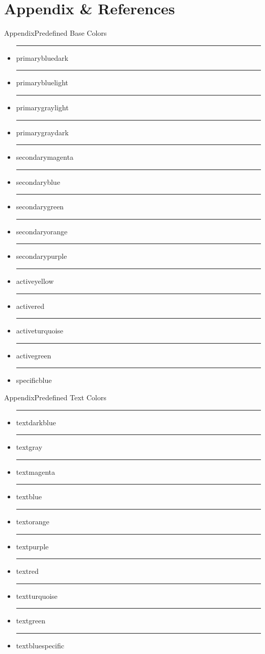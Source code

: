 \documentclass{beamer}
\begin{document}
\section{Appendix \& References}
\appendix 

\begin{frame}{Appendix}{Predefined Base Colors}
	\begin{itemize}
		\item {\color{primarybluedark}\rule{.7cm}{.4cm} primarybluedark}
		\item {\color{primarybluelight}\rule{.7cm}{.4cm} primarybluelight}
		\item {\color{primarygraylight}\rule{.7cm}{.4cm} primarygraylight}
		\item {\color{primarygraydark}\rule{.7cm}{.4cm} primarygraydark}
		\item {\color{secondarymagenta}\rule{.7cm}{.4cm} secondarymagenta}
		\item {\color{secondaryblue}\rule{.7cm}{.4cm} secondaryblue}
		\item {\color{secondarygreen}\rule{.7cm}{.4cm} secondarygreen}
		\item {\color{secondaryorange}\rule{.7cm}{.4cm} secondaryorange}
		\item {\color{secondarypurple}\rule{.7cm}{.4cm} secondarypurple}
		\item {\color{activeyellow}\rule{.7cm}{.4cm} activeyellow}
		\item {\color{activered}\rule{.7cm}{.4cm} activered}
		\item {\color{activeturquoise}\rule{.7cm}{.4cm} activeturquoise}
		\item {\color{activegreen}\rule{.7cm}{.4cm} activegreen}
		\item {\color{specificblue}\rule{.7cm}{.4cm} specificblue}
	\end{itemize}
\end{frame}

\begin{frame}{Appendix}{Predefined Text Colors}
	\begin{itemize}
		\item {\color{textbluedark}\rule{.7cm}{.4cm} textdarkblue}
		\item {\color{textgray}\rule{.7cm}{.4cm} textgray}
		\item {\color{textmagenta}\rule{.7cm}{.4cm} textmagenta}
		\item {\color{textblue}\rule{.7cm}{.4cm} textblue}
		\item {\color{textorange}\rule{.7cm}{.4cm} textorange}
		\item {\color{textpurple}\rule{.7cm}{.4cm} textpurple}
		\item {\color{textred}\rule{.7cm}{.4cm} textred}
		\item {\color{textturquoise}\rule{.7cm}{.4cm} textturquoise}
		\item {\color{textgreen}\rule{.7cm}{.4cm} textgreen}
		\item {\color{textbluespecific}\rule{.7cm}{.4cm} textbluespecific}
	\end{itemize}
\end{frame}
\end{document}
